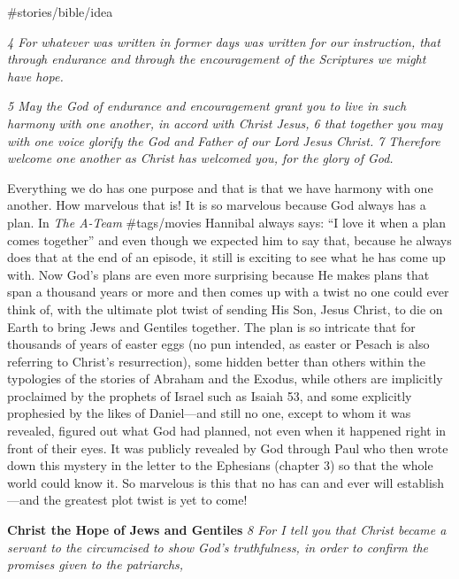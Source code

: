 \#stories/bible/idea

\emph{4 For whatever was written in former days was written for our
instruction, that through endurance and through the encouragement of the
Scriptures we might have hope.}

\emph{5 May the God of endurance and encouragement grant you to live in
such harmony with one another, in accord with Christ Jesus, 6 that
together you may with one voice glorify the God and Father of our Lord
Jesus Christ. 7 Therefore welcome one another as Christ has welcomed
you, for the glory of God.}

Everything we do has one purpose and that is that we have harmony with
one another. How marvelous that is! It is so marvelous because God
always has a plan. In \emph{The A-Team} \#tags/movies Hannibal always
says: ``I love it when a plan comes together'' and even though we
expected him to say that, because he always does that at the end of an
episode, it still is exciting to see what he has come up with. Now God's
plans are even more surprising because He makes plans that span a
thousand years or more and then comes up with a twist no one could ever
think of, with the ultimate plot twist of sending His Son, Jesus Christ,
to die on Earth to bring Jews and Gentiles together. The plan is so
intricate that for thousands of years of easter eggs (no pun intended,
as easter or Pesach is also referring to Christ's resurrection), some
hidden better than others within the typologies of the stories of
Abraham and the Exodus, while others are implicitly proclaimed by the
prophets of Israel such as Isaiah 53, and some explicitly prophesied by
the likes of Daniel---and still no one, except to whom it was revealed,
figured out what God had planned, not even when it happened right in
front of their eyes. It was publicly revealed by God through Paul who
then wrote down this mystery in the letter to the Ephesians (chapter 3)
so that the whole world could know it. So marvelous is this that no has
can and ever will establish---and the greatest plot twist is yet to
come!

\textbf{Christ the Hope of Jews and Gentiles} \emph{8 For I tell you
that Christ became a servant to the circumcised to show God's
truthfulness, in order to confirm the promises given to the patriarchs,}

